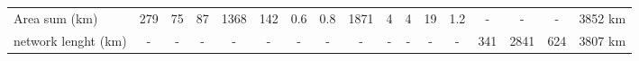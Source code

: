 \documentclass[portrait,a0]{sciposter}
\begin{document}
\begin{minipage}[b]{\textwidth}
\begin{multicols}{3}
\begin{table}[]
\begin{center}
\begin{tabular}{l|cccccccc|c|ccccc|c|r}
          Area sum (km\up{2})&\num{279}&\num{75}&\num{87}&\num{1368}&\num{142}&\num{0,6}&\num{0,8}&\num{1871}&\num{4}&\num{4}&\num{19}&\num{1,2}&-&-&-&\num{3852} km\up{2}\\
          network lenght (km)&-&-&-&-&-&-&-&-&-&-&-&-&\num{341}&\num{2841}&\num{624}&\num{3807} km
        \end{tabular}
      \end{center}
    \end{table}
    \vfill
    

\end{multicols}
\end{minipage}
\end{document}

